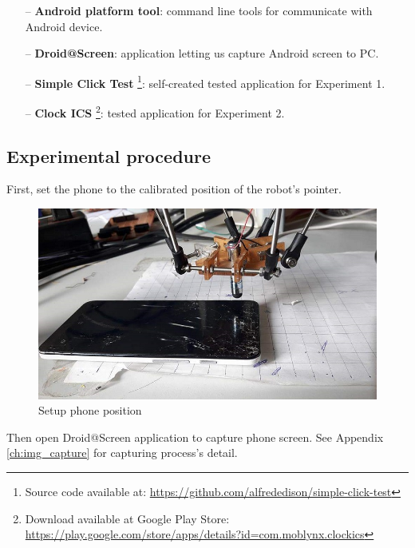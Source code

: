 	\begin{itemize}
		\item[--] \textbf{Android platform tool}: command line tools for communicate with Android device.
		\item[--] \textbf{Droid@Screen}: application letting us capture Android screen to PC.
		\item[--] \textbf{Simple Click Test} \footnote{Source code available at: \url{https://github.com/alfrededison/simple-click-test}}: self-created tested application for Experiment 1.
		\item[--] \textbf{Clock ICS} \footnote{Download available at Google Play Store: \url{https://play.google.com/store/apps/details?id=com.moblynx.clockics}}: tested application for Experiment 2.
	\end{itemize}

\subsection{Experimental procedure}
First, set the phone to the calibrated position of the robot's pointer.

	\begin{figure}[H]
		\centering
		\includegraphics[scale=0.5]{Chapters/Fig/phone_setup.jpg}
		\caption{Setup phone position}
		\label{fig:phone_setup}
	\end{figure}

Then open Droid@Screen application to capture phone screen. See Appendix \ref{ch:img_capture} for capturing process's detail.

